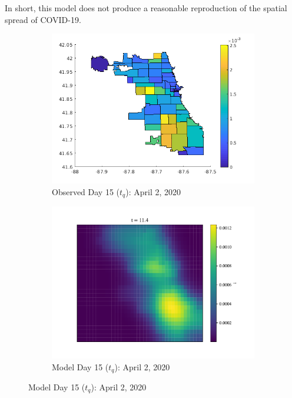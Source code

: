 \documentclass[11pt]{article}
\begin{document}
		In short, this model does not produce a reasonable reproduction of the spatial spread of COVID-19.
		\begin{figure}[H]
			\centering
			\begin{subfigure}{0.5\textwidth}
				\includegraphics[width=\textwidth]{tq-cases}
				\caption{Observed Day 15 ($t_q$): April 2, 2020}
			\end{subfigure}%
			\begin{subfigure}{0.5\textwidth}
				\includegraphics[width=\textwidth]{infected_15}
				\caption{Model Day 15 ($t_q$): April 2, 2020}
			\end{subfigure}
		

\end{figure}
\end{document}
